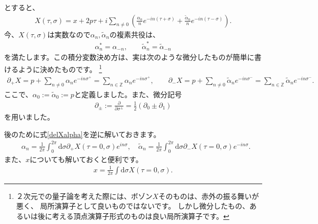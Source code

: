 \documentclass[report,paper=a4, fontsize=12pt, line_length=16cm, number_of_lines=33,dvipdfmx]{jlreq}
\numberwithin{equation}{chapter}
\numberwithin{equation}{section}
\newcommand{\Zb}{\mathbb{Z}}
\newcommand{\del}{\partial}
\newcommand{\alphat}{\tilde{\alpha}}
\newcommand{\di}{\mathrm{d}}
\begin{document}
とすると、
\begin{align}
X(\tau,\sigma)=x+2p\tau+i\sum_{n\ne 0}\left(
\frac{\alpha_n}{n}e^{-in(\tau+\sigma)}
+\frac{\alphat_n}{n}e^{-in(\tau-\sigma)}
\right).
\end{align}
今、$X(\tau,\sigma)$は実数なので$\alpha_n,\alphat_n$の複素共役は、
\begin{align}
\alpha_n^{*}=\alpha_{-n},\qquad
\alphat_n^{*}=\alphat_{-n}
\end{align}
を満たします。この積分変数決め方は、実は次のような微分したものが簡単に書けるように決めたものです。
\footnote{２次元での量子論を考えた際には、ボゾン$X$そのものは、赤外の振る舞いが悪く、
局所演算子として良いものではないです。
しかし微分したもの、あるいは後に考える頂点演算子形式のものは良い局所演算子です。}
\begin{align}
\del_{+}X
=p+\sum_{n\ne 0} \alpha_n e^{-in\sigma^{+}}
=\sum_{n \in \Zb} \alpha_n e^{-in\sigma^{+}}
,\qquad
\del_{-}X
=p+\sum_{n\ne 0} \alphat_n e^{-in\sigma^{-}}
=\sum_{n \in \Zb} \alphat_n e^{-in\sigma^{-}}.
\label{delXalpha}
\end{align}
ここで、$\alpha_0:=\alphat_0:=p$と定義しました。また、微分記号
\begin{align}
\del_{\pm}:=\frac{\del}{\del \sigma^{\pm}} =\frac12 (\del_0 \pm \del_1)
\end{align}
を用いました。

後のために式\eqref{delXalpha}を逆に解いておきます。
\begin{align}
&\alpha_n=\frac{1}{2\pi}\int_0^{2\pi} \di \sigma \del_{+} X(\tau=0,\sigma) e^{in\sigma}, \quad
\alphat_n=\frac{1}{2\pi}\int_0^{2\pi} \di \sigma \del_{-} X(\tau=0,\sigma) e^{-in\sigma}.\label{alphabyX}
\end{align}
また、$x$についても解いておくと便利です。
\begin{align}
x=\frac{1}{2\pi}\int \di\sigma X(\tau=0,\sigma).\label{xbyX}
\end{align}
\end{document}
